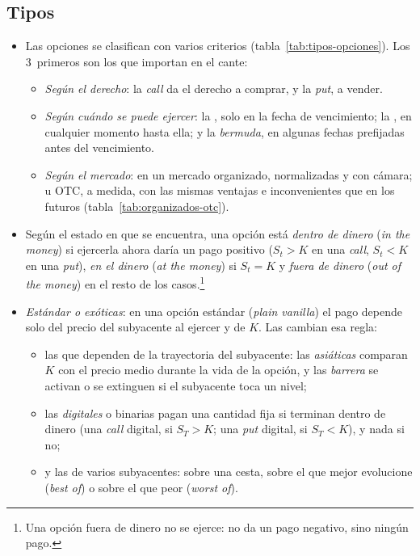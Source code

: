 \documentclass[11pt]{article}
\begin{document}
\subsection{Tipos}\label{sec:tipos-opciones}

\begin{itemize}
\item Las opciones se clasifican con varios criterios (tabla~\ref{tab:tipos-opciones}). Los 3~primeros son los que importan en el cante:
  \begin{itemize}
  \item \emph{Según el derecho}: la \emph{call} da el derecho a comprar, y la \emph{put}, a vender.
  \item \emph{Según cuándo se puede ejercer}: la , solo en la fecha de vencimiento; la , en cualquier momento hasta ella; y la \emph{bermuda}, en algunas fechas prefijadas antes del vencimiento.
  \item \emph{Según el mercado}: en un mercado organizado, normalizadas y con cámara; u OTC, a medida, con las mismas ventajas e inconvenientes que en los futuros (tabla~\ref{tab:organizados-otc}).
  \end{itemize}
\item Según el estado en que se encuentra, una opción está \emph{dentro de dinero} (\emph{in the money}) si ejercerla ahora daría un pago positivo ($S_t>K$ en una \emph{call}, $S_t<K$ en una \emph{put}), \emph{en el dinero} (\emph{at the money}) si $S_t=K$ y \emph{fuera de dinero} (\emph{out of the money}) en el resto de los casos.\footnote{Una opción fuera de dinero no se ejerce: no da un pago negativo, sino ningún pago.}
\item \emph{Estándar o exóticas}: en una opción estándar (\emph{plain vanilla}) el pago depende solo del precio del subyacente al ejercer y de $K$. Las  cambian esa regla:
  \begin{itemize}
  \item las que dependen de la trayectoria del subyacente: las \emph{asiáticas} comparan $K$ con el precio medio durante la vida de la opción, y las \emph{barrera} se activan o se extinguen si el subyacente toca un nivel;
  \item las \emph{digitales} o binarias pagan una cantidad fija si terminan dentro de dinero (una \emph{call} digital, si $S_T>K$; una \emph{put} digital, si $S_T<K$), y nada si no;
  \item y las de varios subyacentes: sobre una cesta, sobre el que mejor evolucione (\emph{best of}) o sobre el que peor (\emph{worst of}).

\end{itemize}
\end{itemize}
\end{document}

